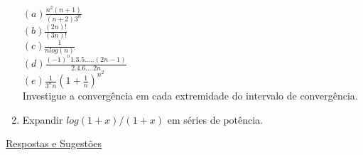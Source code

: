 \documentclass[12pt,openright,oneside,a4paper,english,french,spanish,brazil]{abntex2}
\begin{document}
\begin{enumerate}[]
	$(a)\frac{n^{2}(n+1)}{(n+2)3^{n}}$\\
	
	$(b)\frac{(2n)!}{(3n)!}$\\
	
	$(c)\frac{1}{nlog(n)}$ \\
	
	$(d)\frac{(-1)^{n}1.3.5. ... .(2n-1)}{2.4.6. ... 2n}$\\
	
	$(e)\frac{1}{3^{n}n}(1+\frac{1}{n})^{n^{2}}$\\
	
    Investigue a convergência em cada extremidade do intervalo de convergência.
\item
	Expandir $log(1+x)/(1+x)$ em séries de potência.

\end{enumerate}
\begin{center}
	\underline{Respostas e Sugestões}
\end{center}
\end{document}
